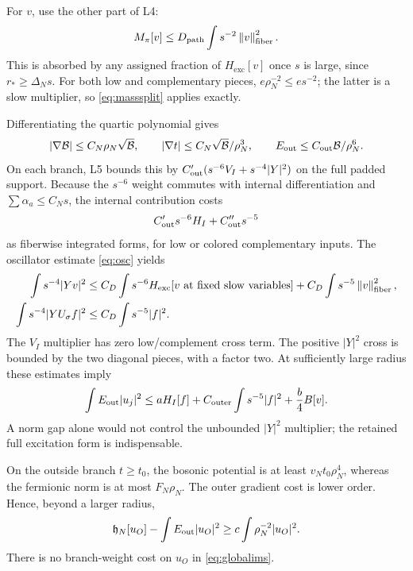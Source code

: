 \documentclass[11pt,letterpaper]{article}
\theoremstyle{definition}\newtheorem{hypothesis}[theorem]{Hypothesis}
\newcommand{\exc}{\mathrm{exc}}
\newcommand{\hh}{\mathfrak h}
\newcommand{\norm}[1]{\left\lVert #1\right\rVert}
\numberwithin{equation}{section}
\begin{document}
For $v$, use the other part of L4:
\begin{equation}
 M_\pi[v]\le D_{\rm path}\int s^{-2}\norm{v}_{\rm fiber}^2.
\end{equation}
This is absorbed by any assigned fraction of $H_{\exc}[v]$ once $s$ is large, since $r_*\ge\Delta_Ns$. For both low and complementary pieces,
$e\rho_N^{-2}\le es^{-2}$; the latter is a slow multiplier, so \eqref{eq:masssplit} applies exactly.

Differentiating the quartic polynomial gives
\begin{equation}
 |\nabla\mathcal B|\le C_N\rho_N\sqrt{\mathcal B},\qquad
 |\nabla t|\le C_N\sqrt{\mathcal B}/\rho_N^3,\qquad
 E_{\rm out}\le C_{\rm out}\mathcal B/\rho_N^6.
\end{equation}
On each branch, L5 bounds this by
$C_{\rm out}'(s^{-6}V_I+s^{-4}|Y|^2)$ on the full padded support. Because the $s^{-6}$ weight commutes with internal differentiation and $\sum\alpha_a\le C_Ns$, the internal contribution costs
\begin{equation}
 C_{\rm out}'s^{-6}H_I+C_{\rm out}''s^{-5}
\end{equation}
as fiberwise integrated forms, for low or colored complementary inputs. The oscillator estimate \eqref{eq:osc} yields
\begin{align}
 \int s^{-4}|Yv|^2&\le C_D\int s^{-6}H_{\exc}[v\text{ at fixed slow variables}]
                         +C_D\int s^{-5}\norm{v}_{\rm fiber}^2,\\
 \int s^{-4}|YU_\sigma f|^2&\le C_D\int s^{-5}|f|^2.
\end{align}
The $V_I$ multiplier has zero low/complement cross term. The positive $|Y|^2$ cross is bounded by the two diagonal pieces, with a factor two. At sufficiently large radius these estimates imply
\begin{equation}
 \int E_{\rm out}|u_j|^2\le aH_I[f]
     +C_{\rm outer}\int s^{-5}|f|^2+\frac b4B[v].\label{eq:outerpay}
\end{equation}
A norm gap alone would not control the unbounded $|Y|^2$ multiplier; the retained full excitation form is indispensable.

On the outside branch $t\ge t_0$, the bosonic potential is at least $v_Nt_0\rho_N^4$, whereas the fermionic norm is at most $F_N\rho_N$. The outer gradient cost is lower order. Hence, beyond a larger radius,
\begin{equation}
 \hh_N[u_O]-\int E_{\rm out}|u_O|^2
       \ge c\int\rho_N^{-2}|u_O|^2.\label{eq:outside}
\end{equation}
There is no branch-weight cost on $u_O$ in \eqref{eq:globalims}.
\end{document}
